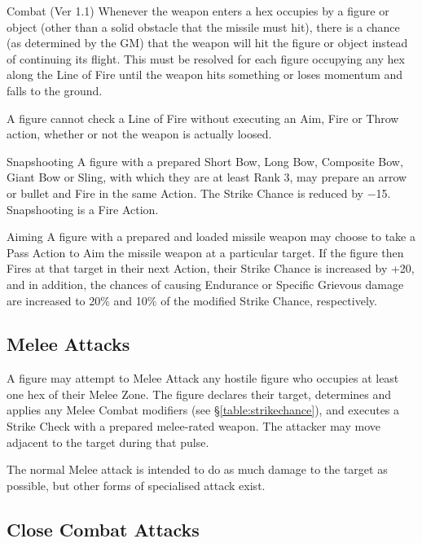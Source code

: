 \begin{Chapter}{Combat (Ver 1.1)}
Whenever the weapon enters a hex occupies by a figure or object (other
than a solid obstacle that the missile must hit), there is a chance
(as determined by the GM) that the weapon will hit the figure or
object instead of continuing its flight. This must be resolved for
each figure occupying any hex along the Line of Fire until the weapon
hits something or loses momentum and falls to the ground.

A figure cannot check a Line of Fire without executing an Aim, Fire or
Throw action, whether or not the weapon is actually loosed.

\begin{Description}

\item[Snapshooting] A figure with a prepared Short Bow, Long Bow,
  Composite Bow, Giant Bow or Sling, with which they are at least Rank
  3, may prepare an arrow or bullet and Fire in the same Action. The
  Strike Chance is reduced by −15.  Snapshooting is a Fire Action.

\item[Aiming] A figure with a prepared and loaded missile weapon may
  choose to take a Pass Action to Aim the missile weapon at a
  particular target. If the figure then Fires at that target in their
  next Action, their Strike Chance is increased by +20, and in
  addition, the chances of causing Endurance or Specific Grievous
  damage are increased to 20\% and 10\% of the modified Strike Chance,
  respectively.

\end{Description}

\subsection{Melee Attacks}

A figure may attempt to Melee Attack any hostile figure who occupies
at least one hex of their Melee Zone.  The figure declares their
target, determines and applies any Melee Combat modifiers (see
\S\ref{table:strikechance}), and executes a Strike Check with a
prepared melee-rated weapon.  The attacker may move adjacent to the
target during that pulse.

The normal Melee attack is intended to do as much damage to the target
as possible, but other forms of specialised attack exist.

\subsection{Close Combat Attacks}


\end{Chapter}
